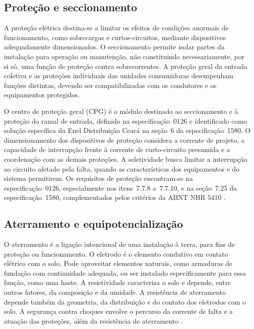\subsection{Proteção e seccionamento}

A proteção elétrica destina-se a limitar os efeitos de condições anormais de funcionamento, como sobrecargas e curtos-circuitos, mediante dispositivos adequadamente dimensionados. O seccionamento permite isolar partes da instalação para operação ou manutenção, não constituindo necessariamente, por si só, uma função de proteção contra sobrecorrentes. A proteção geral da entrada coletiva e as proteções individuais das unidades consumidoras desempenham funções distintas, devendo ser compatibilizadas com os condutores e os equipamentos protegidos.

O centro de proteção geral (CPG) é o módulo destinado ao seccionamento e à proteção do ramal de entrada, definido na especificação~0126 e identificado como solução específica da Enel Distribuição Ceará na seção~6 da especificação~1580. O dimensionamento dos dispositivos de proteção considera a corrente de projeto, a capacidade de interrupção frente à corrente de curto-circuito presumida e a coordenação com as demais proteções. A seletividade busca limitar a interrupção ao circuito afetado pela falta, quando as características dos equipamentos e do sistema permitirem. Os requisitos de proteção encontram-se na especificação~0126, especialmente nos itens~7.7.8 a~7.7.10, e na seção~7.25 da especificação~1580, complementados pelos critérios da ABNT NBR 5410 \cite[itens~7.1.5 e~7.7.8 a~7.7.10]{enel0126}\cite[seções~6 e~7.25]{enel1580}\cite[seção~5.3]{abnt5410}.

\subsection{Aterramento e equipotencialização}
\label{subsec:fund-aterramento}

O aterramento é a ligação intencional de uma instalação à terra, para fins de proteção ou funcionamento. O eletrodo é o elemento condutivo em contato elétrico com o solo. Pode aproveitar elementos naturais, como armaduras de fundação com continuidade adequada, ou ser instalado especificamente para essa função, como uma haste. A resistividade caracteriza o solo e depende, entre outros fatores, da composição e da umidade. A resistência de aterramento depende também da geometria, da distribuição e do contato dos eletrodos com o solo. A segurança contra choques envolve o percurso da corrente de falta e a atuação das proteções, além da resistência de aterramento \cite[itens~5.1.2.2 e~6.4.1]{abnt5410}\cite[seção~7.24]{enel1580}.

